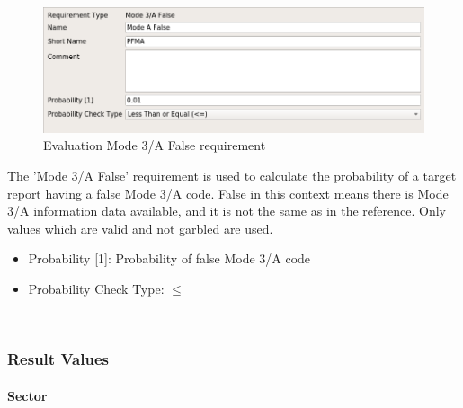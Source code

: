 \begin{figure}[H]
    \includegraphics[width=14cm,frame]{../screenshots/eval_req_m3a_false.png}
  \caption{Evaluation Mode 3/A False requirement}
\end{figure}

The 'Mode 3/A False' requirement is used to calculate the probability of a target report having a false Mode 3/A code. False in this context means there is Mode 3/A information data available, and it is not the same as in the reference. Only values which are valid and not garbled are used. \\

\begin{itemize}  
\item Probability [1]: Probability of false Mode 3/A code
\item Probability Check Type: $\leq$
\end{itemize}
\ \\

\subsubsection{Result Values}

\paragraph{Sector}

